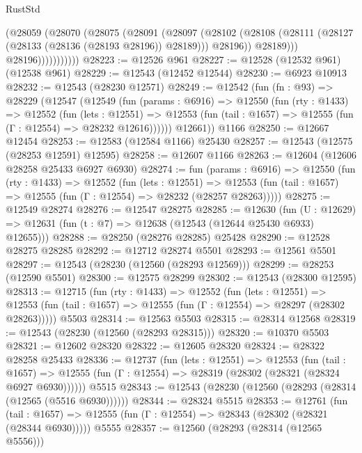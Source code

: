 \begin{lexlean}{RustStd}
\begin{coremodule}
                      (@28059
                        (@28070
                          (@28075
                            (@28091
                              (@28097
                                (@28102
                                  (@28108
                                    (@28111 (@28127 (@28133 (@28136 (@28193 @28196)) @28189)))
                                    @28196))
                                @28189)))
                          @28196)))))))))))
@28223 := @12526 @961
@28227 := @12528 (@12532 @961) (@12538 @961)
@28229 := @12543 (@12452 @12544)
@28230 := @6923 @10913
@28232 := @12543 (@28230 @12571)
@28249 := @12542
    (fun (fn : @93) =>
    @28229
      (@12547
        (@12549
          (fun (params : @6916) =>
          @12550
            (fun (rty : @1433) =>
            @12552
              (fun (lets : @12551) =>
              @12553 (fun (tail : @1657) => @12555 (fun (Γ : @12554) => @28232 @12616))))))
        @12661))
    @1166
@28250 := @12667 @12454
@28253 := @12583 (@12584 @1166) @25430
@28257 := @12543 (@12575 (@28253 @12591) @12595)
@28258 := @12607 @1166
@28263 := @12604 (@12606 @28258 @25433 @6927 @6930)
@28274 := fun (params : @6916) =>
  @12550
    (fun (rty : @1433) =>
    @12552
      (fun (lets : @12551) =>
      @12553 (fun (tail : @1657) => @12555 (fun (Γ : @12554) => @28232 (@28257 @28263)))))
@28275 := @12549 @28274
@28276 := @12547 @28275
@28285 := @12630
    (fun (U : @12629) => @12631 (fun (t : @7) => @12638 (@12543 (@12644 @25430 @6933) @12655)))
@28288 := @28250 (@28276 @28285) @25428
@28290 := @12528 @28275 @28285
@28292 := @12712 @28274 @5501
@28293 := @12561 @5501
@28297 := @12543 (@28230 (@12560 (@28293 @12569)))
@28299 := @28253 (@12590 @5501)
@28300 := @12575 @28299
@28302 := @12543 (@28300 @12595)
@28313 := @12715
    (fun (rty : @1433) =>
    @12552
      (fun (lets : @12551) =>
      @12553 (fun (tail : @1657) => @12555 (fun (Γ : @12554) => @28297 (@28302 @28263)))))
    @5503
@28314 := @12563 @5503
@28315 := @28314 @12568
@28319 := @12543 (@28230 (@12560 (@28293 @28315)))
@28320 := @10370 @5503
@28321 := @12602 @28320
@28322 := @12605 @28320
@28324 := @28322 @28258 @25433
@28336 := @12737
    (fun (lets : @12551) =>
    @12553
      (fun (tail : @1657) =>
      @12555 (fun (Γ : @12554) => @28319 (@28302 (@28321 (@28324 @6927 @6930))))))
    @5515
@28343 := @12543 (@28230 (@12560 (@28293 (@28314 (@12565 (@5516 @6930))))))
@28344 := @28324 @5515
@28353 := @12761
    (fun (tail : @1657) => @12555 (fun (Γ : @12554) => @28343 (@28302 (@28321 (@28344 @6930)))))
    @5555
@28357 := @12560 (@28293 (@28314 (@12565 @5556)))

\end{coremodule}
\end{lexlean}
